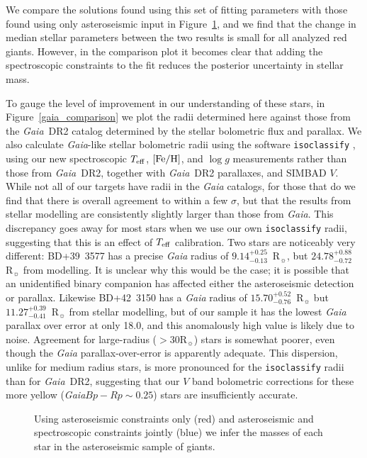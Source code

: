 \documentclass[modern]{aastex62}
\newcommand{\teff}{\mbox{$T_{\rm eff}$}\xspace}
\newcommand{\logg}{\mbox{$\log g$}\xspace}
\newcommand{\feh}{\mbox{$\rm{[Fe/H]}$}\xspace}
\newcommand{\rsun}{\mbox{$\mathrm{R}_{\sun}$}\xspace}
\newcommand{\gaia}{\textit{Gaia}\xspace}
\begin{document}
We compare the solutions found using this set of fitting parameters with those found using only asteroseismic input in Figure~\ref{masses}, and we find that the change in median stellar parameters between the two results is small for all analyzed red giants. However, in the comparison plot it becomes clear that adding the spectroscopic constraints to the fit reduces the posterior uncertainty in stellar mass.

To gauge the level of improvement in our understanding of these stars, in Figure~\ref{gaia_comparison} we plot the radii determined here against those from the \gaia~DR2 catalog determined by the stellar bolometric flux and parallax. 
We also calculate \gaia-like stellar bolometric radii using the software \texttt{isoclassify} \citep{huber2017}, using our new spectroscopic \teff, \feh, and \logg measurements rather than those from \gaia~DR2, together with \gaia~DR2 parallaxes, and SIMBAD $V$. While not all of our targets have radii in the \gaia catalogs, for those that do we find that there is overall agreement to within a few $\sigma$, but that the results from stellar modelling are consistently slightly larger than those from \gaia. 
This discrepancy goes away for most stars when we use our own \texttt{isoclassify} radii, suggesting that this is an effect of \teff calibration. Two stars are noticeably very different: BD+39~3577 has a precise \gaia radius of $9.14^{+0.25}_{-0.13}$~\rsun, but $24.78^{+0.88}_{-0.72}$~\rsun from modelling. It is unclear why this would be the case; it is possible that an unidentified binary companion has affected either the asteroseismic detection or parallax. Likewise BD+42~3150 has a \gaia radius of $15.70^{+0.52}_{-0.76}$~\rsun but $11.27^{+0.39}_{-0.41}$~\rsun from stellar modelling, but of our sample it has the lowest \gaia parallax over error at only 18.0, and this anomalously high value is likely due to noise. Agreement for large-radius ($>30 \rsun$) stars is somewhat poorer, even though the \gaia parallax-over-error is apparently adequate. This dispersion, unlike for medium radius stars, is more pronounced for the \texttt{isoclassify} radii than for \gaia~DR2, suggesting that our $V$ band bolometric corrections for these more yellow (\gaia $Bp-Rp \sim 0.25$) stars are insufficiently accurate. 

\begin{figure}
\caption{\label{masses}
Using asteroseismic constraints only (red) and asteroseismic and spectroscopic constraints jointly (blue) we infer the masses of each star in the asteroseismic sample of giants.}
\end{figure}
\end{document}
